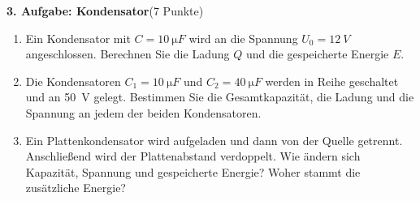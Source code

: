 \documentclass[11pt,a4paper]{article}
\newcommand{\aufgabe}[3]{\bigskip\par\noindent\textbf{#1. Aufgabe: #2}\hfill(#3 Punkte)\par\nopagebreak\smallskip}
\begin{document}
\aufgabe{3}{Kondensator}{7}
\begin{enumerate}
  \item Ein Kondensator mit $C = \qty{10}{\micro F}$ wird an die Spannung $U_0 = \qty{12}{V}$ angeschlossen.
        Berechnen Sie die Ladung $Q$ und die gespeicherte Energie $E$.
  \item Die Kondensatoren $C_1 = \qty{10}{\micro F}$ und $C_2 = \qty{40}{\micro F}$ werden in Reihe
        geschaltet und an \qty{50}{V} gelegt. Bestimmen Sie die Gesamtkapazität, die Ladung und die
        Spannung an jedem der beiden Kondensatoren.
  \item Ein Plattenkondensator wird aufgeladen und dann von der Quelle getrennt. Anschließend wird der
        Plattenabstand verdoppelt. Wie ändern sich Kapazität, Spannung und gespeicherte Energie?
        Woher stammt die zusätzliche Energie?
\end{enumerate}
\end{document}
